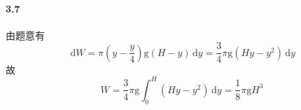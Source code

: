 \paragraph*{3.7}

由题意有
\[
	\,\mathrm d W=\pi\left(y-\dfrac{y}{4}\right)\mathrm{g}(H-y)\,\mathrm dy=\dfrac{3}{4}\pi\mathrm{g}(Hy-y^2)\,\mathrm dy
\]
故
\[
	W=\dfrac{3}{4}\pi\mathrm{g}\int_{0}^{H}(Hy-y^2)\,\mathrm dy=\dfrac{1}{8}\pi\mathrm{g}H^3
\]